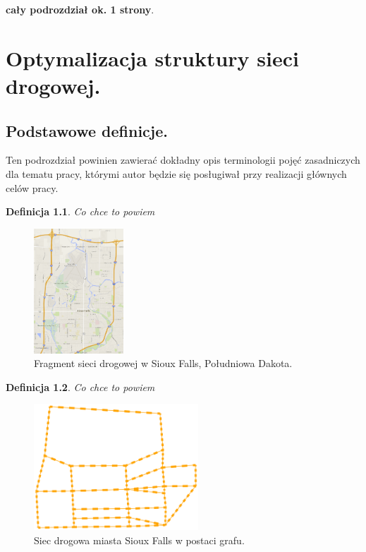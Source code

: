 \documentclass[twoside,12pt]{report}
\newtheorem{definition}{Definicja} %
\begin{document}
{\bf cały podrozdział ok. 1 strony}.



\chapter{Optymalizacja struktury sieci drogowej.}
\section{Podstawowe definicje.}
Ten podrozdział powinien zawierać dokładny opis terminologii  pojęć zasadniczych dla tematu pracy, którymi autor będzie się posługiwał przy realizacji głównych celów pracy. 


\begin{definition}\label{Sieć drogowa}
Co chce to powiem
\end{definition}


\begin{figure}[ht]
\begin{center}
\includegraphics[width=0.30\textwidth]{img/siec}
\caption{Fragment sieci drogowej w Sioux Falls, Południowa Dakota.} 
\end{center}
\end{figure}


\begin{definition}\label{Sieć drogowa w postaci grafu}
Co chce to powiem
\end{definition}


\begin{figure}[ht]
\includegraphics[width=0.55\textwidth]{img/graf}
\caption{Siec drogowa miasta Sioux Falls w postaci grafu.} 
\end{figure}
\end{document}
